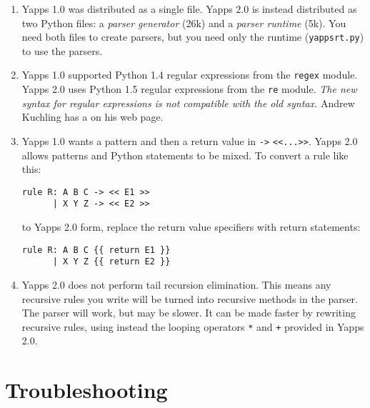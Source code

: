 \documentclass[10pt]{article}
\newcommand{\mysection}[1]{\section{#1}}
\begin{document}
\begin{enumerate}
 \item Yapps 1.0 was distributed as a single file.  Yapps 2.0 is
   instead distributed as two Python files: a \emph{parser generator}
   (26k) and a \emph{parser runtime} (5k).  You need both files to
   create parsers, but you need only the runtime (\texttt{yappsrt.py})
   to use the parsers.
   
 \item Yapps 1.0 supported Python 1.4 regular expressions from the
   \texttt{regex} module.  Yapps 2.0 uses Python 1.5 regular
   expressions from the \texttt{re} module.  \emph{The new syntax for
     regular expressions is not compatible with the old syntax.}
   Andrew Kuchling has a  on his
   web page.
   
 \item Yapps 1.0 wants a pattern and then a return value in \verb|->|
   \verb|<<...>>|.  Yapps 2.0 allows patterns and Python statements to
   be mixed.  To convert a rule like this:

\begin{verbatim}
rule R: A B C -> << E1 >>
      | X Y Z -> << E2 >>
\end{verbatim}
   
   to Yapps 2.0 form, replace the return value specifiers with return
   statements:

\begin{verbatim}
rule R: A B C {{ return E1 }}
      | X Y Z {{ return E2 }}
\end{verbatim}
   
 \item Yapps 2.0 does not perform tail recursion elimination.  This
   means any recursive rules you write will be turned into recursive
   methods in the parser.  The parser will work, but may be slower.
   It can be made faster by rewriting recursive rules, using instead
   the looping operators \verb|*| and \verb|+| provided in Yapps 2.0.

\end{enumerate}

\mysection{Troubleshooting}
\end{document}
